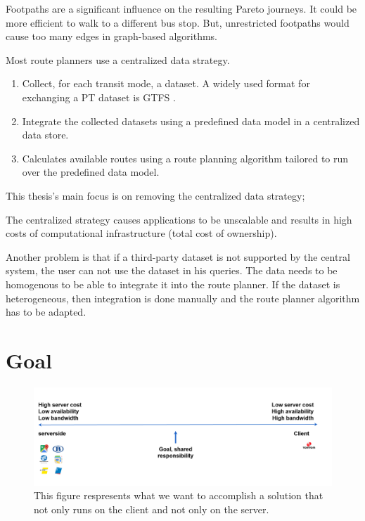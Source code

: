 Footpaths are a significant influence on the resulting Pareto journeys. It could be more efficient to walk to a different bus stop. But, unrestricted footpaths would cause too many edges in graph-based algorithms.

Most route planners use a centralized data strategy. \cite{julianIntro}
\begin{enumerate}
    \item Collect, for each transit mode, a dataset. A widely used format for exchanging a PT dataset is GTFS \cite{GTFS}.
    \item Integrate the collected datasets using a predefined data model in a centralized data store.
    \item Calculates available routes using a route planning algorithm tailored to run over the predefined data model.
\end{enumerate}

This thesis's main focus is on removing the centralized data strategy;

The centralized strategy causes applications to be unscalable and results in high costs of computational infrastructure (total cost of ownership). 

Another problem is that if a third-party dataset is not supported by the central system, the user can not use the dataset in his queries. The data needs to be homogenous to be able to integrate it into the route planner. If the dataset is heterogeneous, then integration is done manually and the route planner algorithm has to be adapted.
\section{Goal}
\begin{figure}[H]
    \centering
    \includegraphics[width=\textwidth]{images/shared responsibility.PNG}
    \caption{This figure respresents what we want to accomplish a solution that not only runs on the client and not only on the server.}
    \label{fig:sharedresponsibility}
\end{figure}
